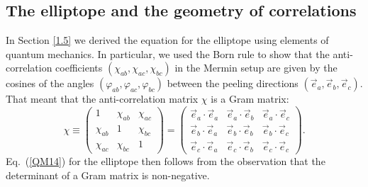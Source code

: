 
\subsection{The elliptope and the geometry of correlations} \label{1.6}

In Section \ref{1.5} we derived the equation for the elliptope using elements of quantum mechanics. In particular, we used the Born rule to show that the anti-correlation coefficients $(\chi_{ab}, \chi_{ac}, \chi_{bc})$ in the Mermin setup are given by the cosines of the angles $(\varphi_{ab}, \varphi_{ac}, \varphi_{bc})$ between the peeling directions $(\vec{e}_a, \vec{e}_b, \vec{e}_c)$. That meant that the anti-correlation matrix $\chi$ is a Gram matrix:
\begin{equation}
\chi \equiv \begin{pmatrix}
1 & \chi_{ab} & \chi_{ac} \\[.2 cm]
\chi_{ab} & 1 & \chi_{bc} \\[.2 cm]
\chi_{ac} & \chi_{bc} & 1
\end{pmatrix} =
\begin{pmatrix}
\vec{e}_a \!  \cdot  \vec{e}_a &  \vec{e}_a \! \cdot  \vec{e}_b  &   \vec{e}_a \! \cdot  \vec{e}_c  \\[.2cm]
\vec{e}_b \!  \cdot  \vec{e}_a & \vec{e}_b \! \cdot  \vec{e}_b & \vec{e}_b \! \cdot  \vec{e}_c \\[.2cm]
\vec{e}_c \!  \cdot   \vec{e}_a & \vec{e}_c \! \cdot  \vec{e}_b  & \vec{e}_c \! \cdot  \vec{e}_c 
\end{pmatrix}.
\label{gram matrix reprise}
\end{equation}
Eq.\ (\ref{QM14}) for the elliptope then follows from the observation that the determinant of a Gram matrix is non-negative. 

